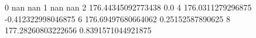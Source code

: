 0 nan nan
1 nan nan
2 176.44345092773438 0.0
4 176.0311279296875 -0.412322998046875
6 176.69497680664062 0.25152587890625
8 177.28260803222656 0.8391571044921875
